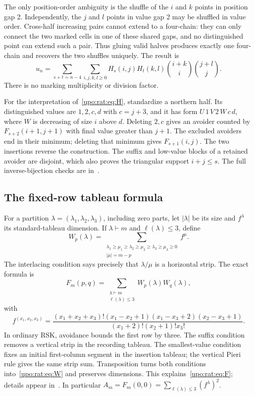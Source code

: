 \documentclass[11pt,letterpaper]{article}
\theoremstyle{remark}\newtheorem{remark}[theorem]{Remark}
\numberwithin{equation}{section}
\begin{document}
The only position-order ambiguity is the shuffle of the $i$ and $k$
points in position gap 2. Independently, the $j$ and $l$ points in value
gap 2 may be shuffled in value order. Cross-half increasing pairs cannot
extend to a four-chain: they can only connect the two marked cells in
one of these shared gaps, and no distinguished point can extend such a
pair. Thus gluing valid halves produces exactly one four-chain and
recovers the two shuffles uniquely. The result is
\begin{equation}\label{upo:rat:eq:gluing}
u_n=\sum_{s+t=n-4}\sum_{i,j,k,l\ge0}
H_s(i,j)H_t(k,l)\binom{i+k}{i}\binom{j+l}{j}.
\end{equation}
There is no marking multiplicity or division factor.

For the interpretation of~\eqref{upo:rat:eq:H}, standardize a northern half.
Its distinguished values are $1,2,c,d$ with $c=j+3$, and it has form
$U\,1\,V\,2\,W\,c\,d$, where $W$ is decreasing of size $i$ above $d$.
Deleting $2,c$ gives an avoider counted by $F_{s+2}(i+1,j+1)$ with final
value greater than $j+1$. The excluded avoiders end in their minimum;
deleting that minimum gives $F_{s+1}(i,j)$. The two insertions reverse
the construction. The suffix and low-value blocks of a retained avoider
are disjoint, which also proves the triangular support $i+j\le s$.
The full inverse-bijection checks are in~\cite[Sections 2--3]{R134}.

\subsection{The fixed-row tableau formula}
For a partition $\lambda=(\lambda_1,\lambda_2,\lambda_3)$, including zero
parts, let $|\lambda|$ be its size and $f^\lambda$ its standard-tableau
dimension. If $\lambda\vdash m$ and $\ell(\lambda)\le3$, define
\begin{equation}\label{upo:rat:eq:W}
W_p(\lambda)=\sum_{\substack{
\lambda_1\ge\mu_1\ge\lambda_2\ge\mu_2\ge\lambda_3\ge\mu_3\ge0\\
|\mu|=m-p}}f^\mu.
\end{equation}
The interlacing condition says precisely that $\lambda/\mu$ is a
horizontal strip. The exact formula is
\begin{equation}\label{upo:rat:eq:F}
F_m(p,q)=\sum_{\substack{\lambda\vdash m\\\ell(\lambda)\le3}}
W_p(\lambda)W_q(\lambda),
\end{equation}
with
\begin{equation}\label{upo:rat:eq:hook}
f^{(x_1,x_2,x_3)}=
\frac{(x_1+x_2+x_3)!(x_1-x_2+1)(x_1-x_3+2)(x_2-x_3+1)}
{(x_1+2)!(x_2+1)!x_3!}.
\end{equation}
In ordinary RSK, avoidance bounds the first row by three. The suffix
condition removes a vertical strip in the recording tableau. The
smallest-value condition fixes an initial first-column segment in the
insertion tableau; the vertical Pieri rule gives the same strip sum.
Transposition turns both conditions into~\eqref{upo:rat:eq:W} and preserves
dimensions. This explains~\eqref{upo:rat:eq:F}; details appear
in~\cite[Section 4]{R134}. In particular
$A_m=F_m(0,0)=\sum_{\ell(\lambda)\le3}(f^\lambda)^2$.
\end{document}
